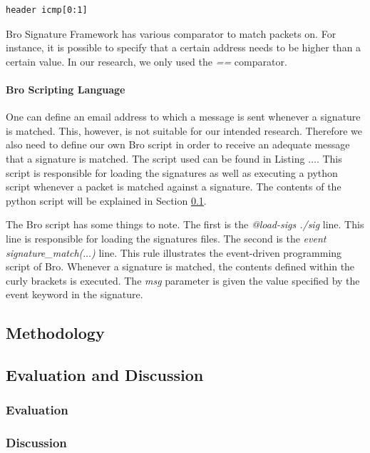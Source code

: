 \begin{lstlisting}[caption={Bro Signature header condition}, label={lst:header-condition}]
header icmp[0:1]
\end{lstlisting} 

Bro Signature Framework has various comparator to match packets on. For instance, it is possible to specify that a certain address needs to be higher than a certain value. In our research, we only used the \emph{==} comparator.

   



\paragraph{Bro Scripting Language}
One can define an email address to which a message is sent whenever a signature is matched. This, however, is not suitable for our intended research. Therefore we also need to define our own Bro script in order to receive an adequate message that a signature is matched. The script used can be found in Listing $\dots$. This script is responsible for loading the signatures as well as executing a python script whenever a packet is matched against a signature. The contents of the python script will be explained in Section \ref{subsec:methodology}. 

The Bro script has some things to note. The first is the \emph{@load-sigs ./sig} line. This line is responsible for loading the signatures files. The second is the \emph{event signature\_match($\dots$)} line. This rule illustrates the event-driven programming script of Bro. Whenever a signature is matched, the contents defined within the curly brackets is executed. The \emph{msg} parameter is given the value specified by the event keyword in the signature.  


\subsection{Methodology}\label{subsec:methodology}

\subsection{Evaluation and Discussion}\label{subsec:evaluation-discussion}
\subsubsection{Evaluation}\label{subsubsec:evalutation}
\subsubsection{Discussion}\label{subsubsec:discussion}

